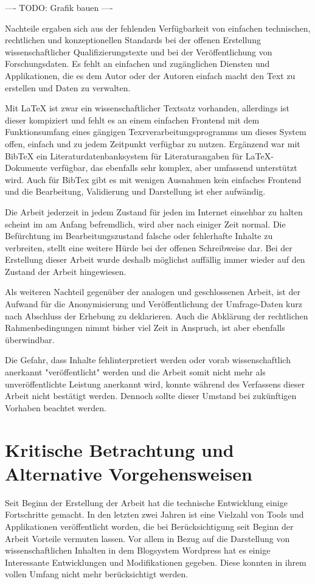 ---- TODO: Grafik bauen ----

Nachteile ergaben sich aus der fehlenden Verfügbarkeit von einfachen technischen, rechtlichen und konzeptionellen Standards bei der offenen Erstellung wissenschaftlicher Qualifizierungstexte und bei der Veröffentlichung von Forschungsdaten. Es fehlt an einfachen und zugänglichen Diensten und Applikationen, die es dem Autor oder der Autoren einfach macht den Text zu erstellen und Daten zu verwalten.

Mit LaTeX ist zwar ein wissenschaftlicher Textsatz vorhanden, allerdings ist dieser kompiziert und fehlt es an einem einfachen Frontend mit dem Funktionsumfang eines gängigen Texrverarbeitungsprogramms um dieses System offen, einfach und zu jedem Zeitpunkt verfügbar zu nutzen. Ergänzend war mit BibTeX ein Literaturdatenbanksystem für Literaturangaben für LaTeX-Dokumente verfügbar, das ebenfalls sehr komplex, aber umfassend unterstützt wird. Auch für BibTex gibt es mit wenigen Ausnahmen kein einfaches Frontend und die Bearbeitung, Validierung und Darstellung ist eher aufwändig.

Die Arbeit jederzeit in jedem Zustand für jeden im Internet einsehbar zu halten scheint im am Anfang befremdlich, wird aber nach einiger Zeit normal. Die Befürchtung im Bearbeitungszustand falsche oder fehlerhafte Inhalte zu verbreiten, stellt eine weitere Hürde bei der offenen Schreibweise dar. Bei der Erstellung dieser Arbeit wurde deshalb möglichst auffällig immer wieder auf den Zustand der Arbeit hingewiesen.

Als weiteren Nachteil gegenüber der analogen und geschlossenen Arbeit, ist der Aufwand für die Anonymisierung und Veröffentlichung der Umfrage-Daten kurz nach Abschluss der Erhebung zu deklarieren. Auch die Abklärung der rechtlichen Rahmenbedingungen nimmt bisher viel Zeit in Anspruch, ist aber ebenfalls überwindbar.

Die Gefahr, dass Inhalte fehlinterpretiert werden oder vorab wissenschaftlich anerkannt "veröffentlicht" werden und die Arbeit somit nicht mehr als unveröffentlichte Leistung anerkannt wird, konnte während des Verfassens dieser Arbeit nicht bestätigt werden. Dennoch sollte dieser Umstand bei zukünftigen Vorhaben beachtet werden.

\section{Kritische Betrachtung und Alternative Vorgehensweisen}

Seit Beginn der Erstellung der Arbeit hat die technische Entwicklung einige Fortschritte gemacht. In den letzten zwei Jahren ist eine Vielzahl von Tools und Applikationen veröffentlicht worden, die bei Berücksichtigung seit Beginn der Arbeit Vorteile vermuten lassen. Vor allem in Bezug auf die Darstellung von wissenschaftlichen Inhalten in dem Blogsystem Wordpress hat es einige Interessante Entwicklungen und Modifikationen gegeben. Diese konnten in ihrem vollen Umfang nicht mehr berücksichtigt werden.

